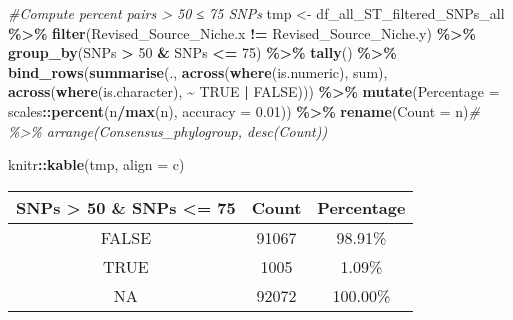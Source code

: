 \documentclass[
]{article}
\newenvironment{Shaded}{\begin{snugshade}}{\end{snugshade}}
\newcommand{\AttributeTok}[1]{\textcolor[rgb]{0.13,0.29,0.53}{#1}}
\newcommand{\CommentTok}[1]{\textcolor[rgb]{0.56,0.35,0.01}{\textit{#1}}}
\newcommand{\ConstantTok}[1]{\textcolor[rgb]{0.56,0.35,0.01}{#1}}
\newcommand{\DecValTok}[1]{\textcolor[rgb]{0.00,0.00,0.81}{#1}}
\newcommand{\FloatTok}[1]{\textcolor[rgb]{0.00,0.00,0.81}{#1}}
\newcommand{\FunctionTok}[1]{\textcolor[rgb]{0.13,0.29,0.53}{\textbf{#1}}}
\newcommand{\NormalTok}[1]{#1}
\newcommand{\OtherTok}[1]{\textcolor[rgb]{0.56,0.35,0.01}{#1}}
\newcommand{\SpecialCharTok}[1]{\textcolor[rgb]{0.81,0.36,0.00}{\textbf{#1}}}
\newcommand{\StringTok}[1]{\textcolor[rgb]{0.31,0.60,0.02}{#1}}
\begin{document}
\begin{Shaded}
\begin{Highlighting}[]
\CommentTok{\#Compute percent pairs \textgreater{} 50 ≤ 75 SNPs}
\NormalTok{tmp }\OtherTok{\textless{}{-}}\NormalTok{ df\_all\_ST\_filtered\_SNPs\_all }\SpecialCharTok{\%\textgreater{}\%} \FunctionTok{filter}\NormalTok{(Revised\_Source\_Niche.x }\SpecialCharTok{!=}\NormalTok{ Revised\_Source\_Niche.y) }\SpecialCharTok{\%\textgreater{}\%} \FunctionTok{group\_by}\NormalTok{(SNPs }\SpecialCharTok{\textgreater{}} \DecValTok{50} \SpecialCharTok{\&}\NormalTok{ SNPs }\SpecialCharTok{\textless{}=} \DecValTok{75}\NormalTok{) }\SpecialCharTok{\%\textgreater{}\%} \FunctionTok{tally}\NormalTok{() }\SpecialCharTok{\%\textgreater{}\%} 
  \FunctionTok{bind\_rows}\NormalTok{(}\FunctionTok{summarise}\NormalTok{(.,}
                      \FunctionTok{across}\NormalTok{(}\FunctionTok{where}\NormalTok{(is.numeric), sum),}
                      \FunctionTok{across}\NormalTok{(}\FunctionTok{where}\NormalTok{(is.character), }\SpecialCharTok{\textasciitilde{}} \ConstantTok{TRUE} \SpecialCharTok{|} \ConstantTok{FALSE}\NormalTok{))) }\SpecialCharTok{\%\textgreater{}\%}
  \FunctionTok{mutate}\NormalTok{(}\AttributeTok{Percentage =}\NormalTok{ scales}\SpecialCharTok{::}\FunctionTok{percent}\NormalTok{(n}\SpecialCharTok{/}\FunctionTok{max}\NormalTok{(n), }\AttributeTok{accuracy =} \FloatTok{0.01}\NormalTok{)) }\SpecialCharTok{\%\textgreater{}\%}
  \FunctionTok{rename}\NormalTok{(}\StringTok{\textquotesingle{}Count\textquotesingle{}} \OtherTok{=}\NormalTok{ n)}\CommentTok{\# \%\textgreater{}\% arrange(Consensus\_phylogroup, desc(Count))}

\NormalTok{knitr}\SpecialCharTok{::}\FunctionTok{kable}\NormalTok{(tmp, }\AttributeTok{align =} \StringTok{\textquotesingle{}c\textquotesingle{}}\NormalTok{)}
\end{Highlighting}
\end{Shaded}

\begin{longtable}[]{@{}ccc@{}}
\toprule\noalign{}
SNPs \textgreater{} 50 \& SNPs \textless= 75 & Count & Percentage \\
\midrule\noalign{}
\endhead
\bottomrule\noalign{}
\endlastfoot
FALSE & 91067 & 98.91\% \\
TRUE & 1005 & 1.09\% \\
NA & 92072 & 100.00\% \\
\end{longtable}
\end{document}
